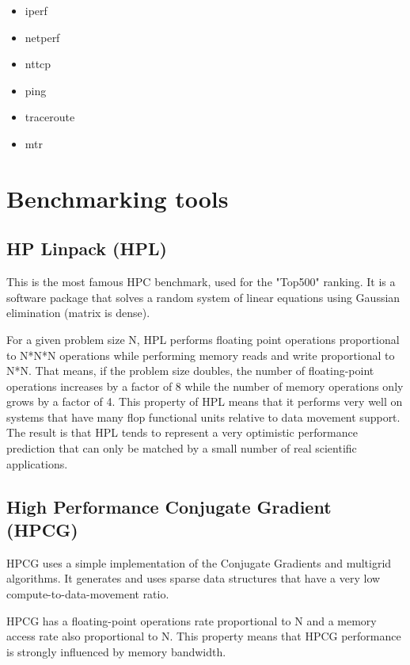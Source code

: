 \begin{itemize}
        \begin{itemize}
            \item iperf
            \item netperf
            \item nttcp
            \item ping
            \item traceroute
            \item mtr
        \end{itemize}
\end{itemize}


\section{Benchmarking tools}

\subsection{HP Linpack (HPL)}

This is the most famous HPC benchmark, used for the "Top500" ranking. 
It is a software package that solves a random system of linear equations using Gaussian elimination (matrix is dense).

For a given problem size N, HPL performs floating point operations proportional
to N*N*N operations while performing memory reads and write proportional to
N*N.
That means, if the problem size doubles, the number of floating-point operations
increases by a factor of 8 while the number of memory operations only grows by
a factor of 4.
This property of HPL means that it performs very well on systems that have many
flop functional units relative to data movement support. The result is that HPL
tends to represent a very optimistic performance prediction that can only be
matched by a small number of real scientific applications.

\subsection{High Performance Conjugate Gradient (HPCG)}

HPCG uses a simple implementation of the Conjugate Gradients and multigrid
algorithms. It generates and uses sparse data structures that have a very low
compute-to-data-movement ratio.

HPCG has a floating-point operations rate proportional to N and a memory access
rate also proportional to N.
This property means that HPCG performance is strongly influenced by memory
bandwidth.


